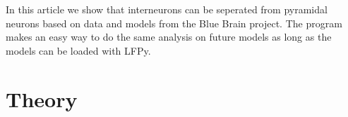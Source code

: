\documentclass[altfont, fleqn]{uiophd}
\begin{document}
In this article we show that interneurons can be seperated from pyramidal
neurons based on data and models from the Blue Brain project. 
The program makes an easy way to do the same analysis
on future models as long as the models can be loaded with LFPy.


\chapter{Theory}

\vspace{1em} 
\startcontents
{}
  
\end{document}
